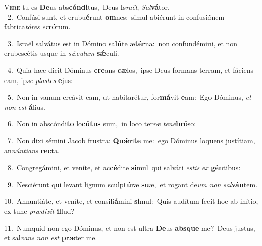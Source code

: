 \lettrine{\initial\textcolor{\initialcolor}{V}}{ere} tu es \textbf{De}\-us abs\-\textbf{cón}\-\textbf{di}tus,~\star Deus Is\-\textit{ra}\-\textit{ël}, \textit{Sal}\-\textbf{vá}tor.\\
{\numbfont\textcolor{\numbcolor}{~2.}}~Confúsi sunt, et erubu\-\textbf{é}\-runt \textbf{om}\-nes:~\star simul abiérunt in confusiónem fabrica\-\textit{tó}\-\textit{res} \textit{er}\-\textbf{ró}rum.\par
{\numbfont\textcolor{\numbcolor}{~3.}}~Israël salvátus est in Dómino sa\-\textbf{lú}\-te æ\-\textbf{tér}\-na:~\star non confundémini, et non erubescétis usque in \textit{sǽ}\-\textit{cu}\textit{lum} \textbf{sǽ}\-culi.\par
{\numbfont\textcolor{\numbcolor}{~4.}}~Quia hæc dicit Dóminus \textbf{cre}\-ans \textbf{cæ}\-los,~\star ipse Deus formans terram, et fáciens eam, ip\textit{se} \textit{plas}\-\textit{tes} \textbf{e}\-jus:\par
{\numbfont\textcolor{\numbcolor}{~5.}}~Non in vanum creávit eam, ut habitarétur, for\-\textbf{má}\-vit \textbf{e}\-am:~\star Ego Dóminus, \textit{et} \textit{non} \textit{est} \textbf{á}\-lius.\par
{\numbfont\textcolor{\numbcolor}{~6.}}~Non in abscóndi\textbf{to} lo\-\textbf{cú}\-\textbf{tus} sum,~\star in loco ter\textit{ræ} \textit{te}\-\textit{ne}\textbf{bró}so:\par
{\numbfont\textcolor{\numbcolor}{~7.}}~Non dixi sémini Jacob frustra: \textbf{Quǽ}\-ri\textbf{te} me:~\star ego Dóminus loquens justítiam, an\-\textit{nún}\-\textit{ti}\textit{ans} \textbf{rec}\-ta.\par
{\numbfont\textcolor{\numbcolor}{~8.}}~Congregámini, et veníte, et ac\-\textbf{cé}\-dite \textbf{si}\-mul~\star qui salváti \textit{es}\-\textit{tis} \textit{ex} \textbf{gén}\-tibus:\par
{\numbfont\textcolor{\numbcolor}{~9.}}~Nesciérunt qui levant lignum sculp\-\textbf{tú}\-ræ \textbf{su}\-æ,~\star et rogant de\textit{um} \textit{non} \textit{sal}\-\textbf{ván}tem.\par
{\numbfont\textcolor{\numbcolor}{10.}}~Annuntiáte, et veníte, et consili\-\textbf{á}\-mini \textbf{si}\-mul:~\star Quis audítum fecit hoc ab inítio, ex tunc \textit{præ}\-\textit{dí}\textit{xit} \textbf{il}\-lud?\par
{\numbfont\textcolor{\numbcolor}{11.}}~Numquid non ego Dóminus, et non est ultra \textbf{De}\-us \textbf{abs}\-\textbf{que} me?~\star Deus justus, et sal\textit{vans} \textit{non} \textit{est} \textbf{præ}\-ter me.\par
